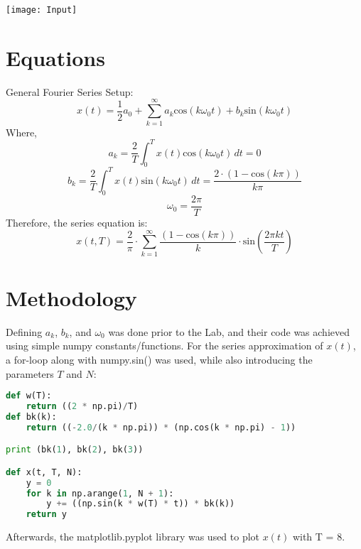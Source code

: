 \documentclass[12pt]{report}
\begin{document}
\begin{center}
    \texttt{[image: Input]}\\
\end{center}

\section{Equations}
General Fourier Series Setup:
\begin{equation}
    x(t) = \frac{1}{2} a_0 + \sum_{k=1}^{\infty} a_k\text{cos}(k\omega_0t) + b_k\text{sin}(k\omega_0t)
\end{equation}
Where,\\
\begin{equation}
    a_k = \frac{2}{T} \int_{0}^{T} x(t)\text{cos}(k\omega_0t) \,dt = 0
\end{equation}
\begin{equation}
    b_k = \frac{2}{T} \int_{0}^{T} x(t)\text{sin}(k\omega_0t) \,dt = \frac{2\cdot(1 - \text{cos}(k\pi))}{k\pi}
\end{equation}
\begin{equation}
    \omega_0 = \frac{2\pi}{T}
\end{equation}
Therefore, the series equation is:
\begin{equation}
    x(t,T) = \frac{2}{\pi}\cdot \sum_{k=1}^{\infty} \frac{(1 - \text{cos}(k\pi))}{k}\cdot\text{sin}\left(\frac{2\pi kt}{T}\right)
\end{equation}

\pagebreak

\section{Methodology}
Defining $a_k$, $b_k$, and $\omega_0$ was done prior to the Lab, and their code was achieved using simple numpy constants/functions. For the series approximation of $x(t)$, a for-loop along with numpy.sin() was used, while also introducing the parameters $T$ and $N$:

\begin{lstlisting}[language=Python]
def w(T):
    return ((2 * np.pi)/T)
def bk(k):
    return ((-2.0/(k * np.pi)) * (np.cos(k * np.pi) - 1))

print (bk(1), bk(2), bk(3))

def x(t, T, N):
    y = 0
    for k in np.arange(1, N + 1):
        y += ((np.sin(k * w(T) * t)) * bk(k))
    return y
\end{lstlisting}
Afterwards, the matplotlib.pyplot library was used to plot $x(t)$ with T = 8.
\end{document}
